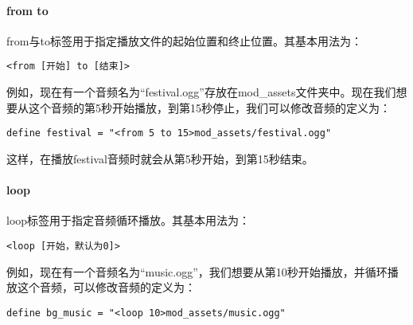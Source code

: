 \paragraph{from to} from与to标签用于指定播放文件的起始位置和终止位置。其基本用法为：
\begin{lstlisting}
<from [开始] to [结束]>
\end{lstlisting}
例如，现在有一个音频名为“festival.ogg”存放在mod\_assets文件夹中。现在我们想要从这个音频的第5秒开始播放，到第15秒停止，我们可以修改音频的定义为：

\begin{lstlisting}
define festival = "<from 5 to 15>mod_assets/festival.ogg"
\end{lstlisting}

这样，在播放festival音频时就会从第5秒开始，到第15秒结束。

\paragraph{loop} loop标签用于指定音频循环播放。其基本用法为：

\begin{lstlisting}
<loop [开始，默认为0]>
\end{lstlisting}

例如，现在有一个音频名为“music.ogg”，我们想要从第10秒开始播放，并循环播放这个音频，可以修改音频的定义为：

\begin{lstlisting}
define bg_music = "<loop 10>mod_assets/music.ogg"
\end{lstlisting}

